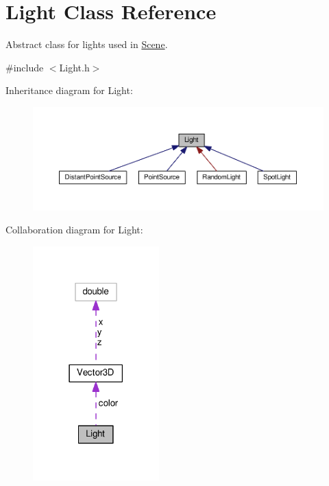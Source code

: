 \hypertarget{classLight}{}\section{Light Class Reference}
\label{classLight}


Abstract class for lights used in \hyperlink{classScene}{Scene}.  




{\ttfamily \#include $<$Light.\+h$>$}



Inheritance diagram for Light\+:\nopagebreak
\begin{figure}[H]
\begin{center}
\leavevmode
\includegraphics[width=350pt]{classLight__inherit__graph}
\end{center}
\end{figure}


Collaboration diagram for Light\+:\nopagebreak
\begin{figure}[H]
\begin{center}
\leavevmode
\includegraphics[width=138pt]{classLight__coll__graph}
\end{center}
\end{figure}

